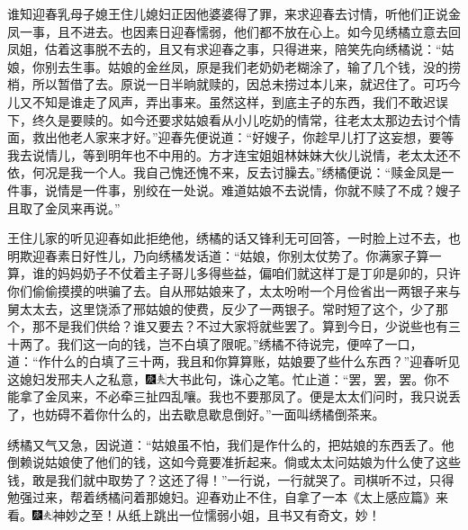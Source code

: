 谁知迎春乳母子媳王住儿媳妇正因他婆婆得了罪，来求迎春去讨情，听他们正说金凤一事，且不进去。也因素日迎春懦弱，他们都不放在心上。如今见绣橘立意去回凤姐，估着这事脱不去的，且又有求迎春之事，只得进来，陪笑先向绣橘说：“姑娘，你别去生事。姑娘的金丝凤，原是我们老奶奶老糊涂了，输了几个钱，没的捞梢，所以暂借了去。原说一日半晌就赎的，因总未捞过本儿来，就迟住了。可巧今儿又不知是谁走了风声，弄出事来。虽然这样，到底主子的东西，我们不敢迟误下，终久是要赎的。如今还要求姑娘看从小儿吃奶的情常，往老太太那边去讨个情面，救出他老人家来才好。”迎春先便说道：“好嫂子，你趁早儿打了这妄想，要等我去说情儿，等到明年也不中用的。方才连宝姐姐林妹妹大伙儿说情，老太太还不依，何况是我一个人。我自己愧还愧不来，反去讨臊去。”绣橘便说：“赎金凤是一件事，说情是一件事，别绞在一处说。难道姑娘不去说情，你就不赎了不成？嫂子且取了金凤来再说。”

王住儿家的听见迎春如此拒绝他，绣橘的话又锋利无可回答，一时脸上过不去，也明欺迎春素日好性儿，乃向绣橘发话道：“姑娘，你别太仗势了。你满家子算一算，谁的妈妈奶子不仗着主子哥儿多得些益，偏咱们就这样丁是丁卯是卯的，只许你们偷偷摸摸的哄骗了去。自从邢姑娘来了，太太吩咐一个月俭省出一两银子来与舅太太去，这里饶添了邢姑娘的使费，反少了一两银子。常时短了这个，少了那个，那不是我们供给？谁又要去？不过大家将就些罢了。算到今日，少说些也有三十两了。我们这一向的钱，岂不白填了限呢。”绣橘不待说完，便啐了一口，道：“作什么的白填了三十两，我且和你算算账，姑娘要了些什么东西？”迎春听见这媳妇发邢夫人之私意，{\includegraphics[width=3mm]{../Images/00004}\includegraphics[width=3mm]{../Images/00012}\footnotesize \kaishu 大书此句，诛心之笔。}忙止道：“罢，罢，罢。你不能拿了金凤来，不必牵三扯四乱嚷。我也不要那凤了。便是太太们问时，我只说丢了，也妨碍不着你什么的，出去歇息歇息倒好。”一面叫绣橘倒茶来。

绣橘又气又急，因说道：“姑娘虽不怕，我们是作什么的，把姑娘的东西丢了。他倒赖说姑娘使了他们的钱，这如今竟要准折起来。倘或太太问姑娘为什么使了这些钱，敢是我们就中取势了？这还了得！”一行说，一行就哭了。司棋听不过，只得勉强过来，帮着绣橘问着那媳妇。迎春劝止不住，自拿了一本《太上感应篇》来看。{\includegraphics[width=3mm]{../Images/00004}\includegraphics[width=3mm]{../Images/00012}\footnotesize \kaishu 神妙之至！从纸上跳出一位懦弱小姐，且书又有奇文，妙！}

